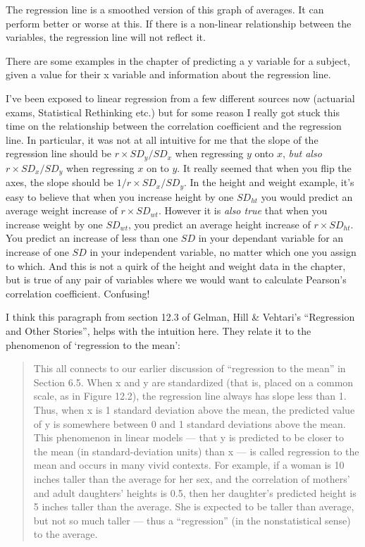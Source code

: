 \documentclass[
]{book}
\begin{document}
The regression line is a smoothed version of this graph of averages. It can perform better or worse at this. If there is a non-linear relationship between the variables, the regression line will not reflect it.

There are some examples in the chapter of predicting a y variable for a subject, given a value for their x variable and information about the regression line.

I've been exposed to linear regression from a few different sources now (actuarial exams, Statistical Rethinking etc.) but for some reason I really got stuck this time on the relationship between the correlation coefficient and the regression line. In particular, it was not at all intuitive for me that the slope of the regression line should be \(r \times SD_y / SD_x\) when regressing \(y\) onto \(x\), \emph{but also} \(r \times SD_x / SD_y\) when regressing \(x\) on to \(y\). It really seemed that when you flip the axes, the slope should be \(1/r \times SD_x / SD_y\).
In the height and weight example, it's easy to believe that when you increase height by one \(SD_{ht}\) you would predict an average weight increase of \(r \times SD_{wt}\). However it is \emph{also true} that when you increase weight by one \(SD_{wt}\), you predict an average height increase of \(r \times SD_{ht}\). You predict an increase of less than one \(SD\) in your dependant variable for an increase of one \(SD\) in your independent variable, no matter which one you assign to which. And this is not a quirk of the height and weight data in the chapter, but is true of any pair of variables where we would want to calculate Pearson's correlation coefficient. Confusing!

I think this paragraph from section 12.3 of Gelman, Hill \& Vehtari's ``Regression and Other Stories'', helps with the intuition here. They relate it to the phenomenon of `regression to the mean':

\begin{quote}
This all connects to our earlier discussion of ``regression to the mean'' in Section 6.5. When x and y are standardized (that is, placed on a common scale, as in Figure 12.2), the regression line always has slope less than 1. Thus, when x is 1 standard deviation above the mean, the predicted value of y is somewhere between 0 and 1 standard deviations above the mean. This phenomenon in linear models --- that y is predicted to be closer to the mean (in standard-deviation units) than x --- is called regression to the mean and occurs in many vivid contexts.
For example, if a woman is 10 inches taller than the average for her sex, and the correlation of mothers' and adult daughters' heights is 0.5, then her daughter's predicted height is 5 inches taller than the average. She is expected to be taller than average, but not so much taller --- thus a ``regression'' (in the nonstatistical sense) to the average.
\end{quote}
\end{document}
